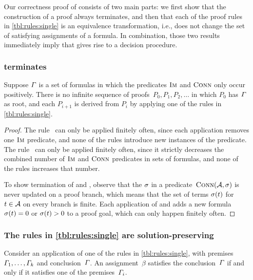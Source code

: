 \documentclass[acmsmall,review,anonymous,screen]{acmart}\settopmatter{printfolios=true,printccs=true,printacmref=true}
\theoremstyle{definition}
\begin{document}
Our correctness proof of \Calculus{} consists of two main parts: we
first show that the construction of a proof always terminates, and
then that each of the proof rules in \cref{tbl:rules:single} is
an equivalence transformation, i.e., does not change the set of
satisfying assignments of a formula. In combination, those two results
immediately imply that \Calculus{} gives rise to a decision procedure.

\subsubsection{\Calculus{} terminates}
\begin{lemma}\label{lma:single-terminates}
  Suppose $\varGamma{}$ is a set of formulas in which the predicates
  $\operatorname{\textsc{Im}}$ and $\operatorname{\textsc{Conn}}$ only occur positively. There is no
  infinite sequence of proofs~$P_0, P_1, P_2, \ldots$ in which $P_0$
  has $\varGamma{}$ as root, and each $P_{i+1}$ is derived from
  $P_i$ by applying one of the rules in \cref{tbl:rules:single}.
\end{lemma}

\begin{proof}
  The rule~\Expand{} can only be applied finitely often, since each
  application removes one $\operatorname{\textsc{Im}}$ predicate, and none of the rules
  introduce new instances of the predicate. The rule~\Subsume{} can
  only be applied finitely often, since it strictly decreases the
  combined number of $\operatorname{\textsc{Im}}$ and $\operatorname{\textsc{Conn}}$ predicates in sets of
  formulas, and none of the rules increases that number.

  To show termination of \Split{} and \Propagate{}, observe that the
  $\operatorname{\sigma}$ in a predicate~$\operatorname{\textsc{Conn}}(\mathcal{A}, \operatorname{\sigma})$ is never
  updated on a proof branch, which means that the set of terms
  $\operatorname{\sigma}(t)$ for $t \in \mathcal{A}$ on every branch is finite. Each
  application of \Split{} and \Propagate{} adds a new
  formula~$\operatorname{\sigma}(t) = 0$ or $\operatorname{\sigma}(t) > 0$
  to a proof goal, which can only happen finitely often.
\end{proof}

\subsubsection{The rules in \cref{tbl:rules:single} are solution-preserving}

\begin{lemma}\label{lma:single-correct}
  Consider an application of one of the rules in
  \cref{tbl:rules:single}, with
  premises~$\varGamma_1, \ldots, \varGamma_k$ and
  conclusion~$\varGamma$. An assignment~$\beta$ satisfies the
  conclusion~$\varGamma$ if and only if it satisfies one of the
  premises~$\varGamma_i$.
\end{lemma}
\end{document}

